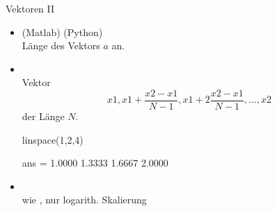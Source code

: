 \documentclass[hyperref={xetex}]{beamer}
\begin{document}
%
%
\begin{frame}[fragile]{Vektoren II}
\begin{itemize}
\item {}(Matlab) (Python)\\ Länge des Vektors $a$ an.
\item {}\\ Vektor
\[ x1, x1+\frac{x2-x1}{N-1}, x1+2 \frac{x2-x1}{N-1}, \dots ,x2  \]
der Länge $N$.
\begin{matlabin}
linspace(1,2,4)
\end{matlabin}
\begin{matlab}
ans =
    1.0000    1.3333    1.6667    2.0000 
\end{matlab}

\item {}\\ wie , nur logarith. Skalierung
\end{itemize}
\end{frame}
\end{document}

